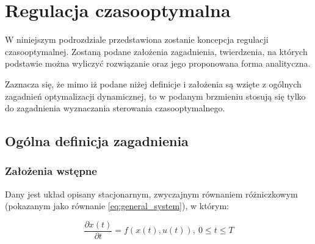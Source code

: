 \section{Regulacja czasooptymalna}
\label{sec:toc}

W niniejszym podrozdziale przedstawiona zostanie koncepcja regulacji czasooptymalnej. Zostaną podane założenia zagadnienia, twierdzenia, na których podstawie można wyliczyć rozwiązanie oraz jego proponowana forma analityczna.

Zaznacza się, że mimo iż podane niżej definicje i założenia są wzięte z ogólnych zagadnień optymalizacji dynamicznej, to w podanym brzmieniu stosują się tylko do zagadnienia wyznaczania sterowania czasooptymalnego.

\subsection{Ogólna definicja zagadnienia}
\label{sub:toc-def}

\subsubsection{Założenia wstępne}
\label{sub:toc-def-intro}
Dany jest układ opisany stacjonarnym, zwyczajnym równaniem różniczkowym (pokazanym jako równanie \ref{eq:general_system}), w którym:

\begin{equation}\label{eq:general_system}
    \frac{\partial x(t)}{\partial t} = f(x(t), u(t)), ~ 0 \leq t \leq T
\end{equation}

